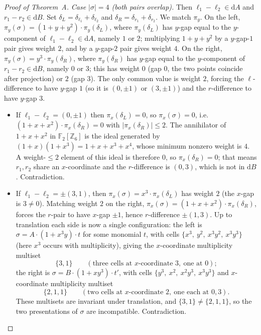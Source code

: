 \documentclass[11pt]{article}
\newcommand{\Z}{\mathbb{Z}}
\newcommand{\F}[1]{\mathbb{F}_{#1}}
\newcommand{\wt}[1]{\lvert #1\rvert}
\theoremstyle{plain}
\theoremstyle{definition}
\theoremstyle{remark}
\begin{document}
\begin{proof}[Proof of Theorem~A]
\emph{Case $\wt{\sigma}=4$ (both pairs overlap).} Then $\ell_1-\ell_2\in\mathrm dA$ and
$r_1-r_2\in\mathrm dB$. Set $\delta_L=\delta_{\ell_1}+\delta_{\ell_2}$ and
$\delta_R=\delta_{r_1}+\delta_{r_2}$. We match $\pi_y$. On the left,
$\pi_y(\sigma)=(1+y+y^2)\cdot\pi_y(\delta_L)$, where $\pi_y(\delta_L)$ has $y$-gap equal to
the $y$-component of $\ell_1-\ell_2\in\mathrm dA$, namely $1$ or $2$; multiplying
$1+y+y^2$ by a $y$-gap-$1$ pair gives weight $2$, and by a $y$-gap-$2$ pair gives weight $4$.
On the right, $\pi_y(\sigma)=y^3\cdot\pi_y(\delta_R)$, where $\pi_y(\delta_R)$ has $y$-gap
equal to the $y$-component of $r_1-r_2\in\mathrm dB$, namely $0$ or $3$; this has weight $0$
(gap $0$, the two points coincide after projection) or $2$ (gap $3$). The only common value
is weight $2$, forcing the $\ell$-difference to have $y$-gap $1$ (so it is $(0,\pm1)$ or
$(3,\pm1)$) and the $r$-difference to have $y$-gap $3$.
\begin{itemize}
\item If $\ell_1-\ell_2=(0,\pm1)$ then $\pi_x(\delta_L)=0$, so $\pi_x(\sigma)=0$, i.e.\
  $(1+x+x^2)\cdot\pi_x(\delta_R)=0$ with $\wt{\pi_x(\delta_R)}\le2$. The annihilator of
  $1+x+x^2$ in $\F2[\Z_6]$ is the ideal generated by $(1+x)(1+x^3)=1+x+x^3+x^4$, whose
  minimum nonzero weight is $4$. A weight-$\le2$ element of this ideal is therefore $0$, so
  $\pi_x(\delta_R)=0$; that means $r_1,r_2$ share an $x$-coordinate and the $r$-difference is
  $(0,3)$, which is not in $\mathrm dB$. Contradiction.
\item If $\ell_1-\ell_2=\pm(3,1)$, then $\pi_x(\sigma)=x^3\cdot\pi_x(\delta_L)$ has weight $2$
  (the $x$-gap is $3\ne0$). Matching weight $2$ on the right,
  $\pi_x(\sigma)=(1+x+x^2)\cdot\pi_x(\delta_R)$, forces the $r$-pair to have $x$-gap $\pm1$,
  hence $r$-difference $\pm(1,3)$. Up to translation each side is now a single
  configuration: the left is $\sigma=A\cdot(1+x^3 y)\cdot t$ for some monomial $t$, with
  cells $\{x^3,\ y^2,\ x^3y^2,\ x^3y^3\}$ (here $x^3$ occurs with multiplicity), giving the
  $x$-coordinate multiplicity multiset
  \[
    \{3,1\}\qquad(\text{three cells at }x\text{-coordinate }3,\ \text{one at }0);
  \]
  the right is $\sigma=B\cdot(1+x y^3)\cdot t'$, with cells
  $\{y^3,\ x^2,\ x^2y^3,\ x^3y^3\}$ and $x$-coordinate multiplicity multiset
  \[
    \{2,1,1\}\qquad(\text{two cells at }x\text{-coordinate }2,\ \text{one each at }0,3).
  \]
  These multisets are invariant under translation, and $\{3,1\}\ne\{2,1,1\}$, so the two
  presentations of $\sigma$ are incompatible. Contradiction.
\end{itemize}


\end{proof}
\end{document}
